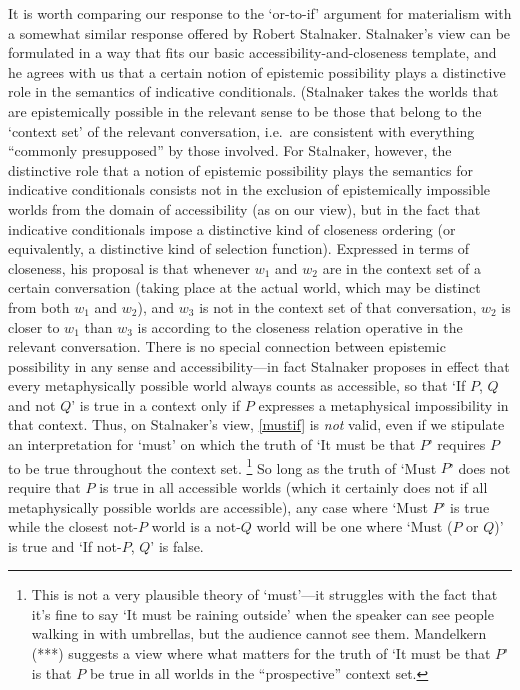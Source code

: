 \documentclass[If.tex]{subfiles}
\begin{document}
It is worth comparing our response to the ‘or-to-if’ argument for materialism with a somewhat similar response offered by Robert Stalnaker.  Stalnaker's view can be formulated in a way that fits our basic accessibility-and-closeness template, and he agrees with us that a certain notion of epistemic possibility plays a distinctive role in the semantics of indicative conditionals.  (Stalnaker takes the worlds that are epistemically possible in the relevant sense to be those that belong to the ‘context set’ of the relevant conversation, i.e.\ are consistent with everything “commonly presupposed” by those involved.  For Stalnaker, however, the distinctive role that a notion of epistemic possibility plays the semantics for indicative conditionals consists not in the exclusion of epistemically impossible worlds from the domain of accessibility (as on our view), but in the fact that indicative conditionals impose a distinctive kind of closeness ordering (or equivalently, a distinctive kind of selection function).   Expressed in terms of closeness, his proposal is that whenever $w_1$ and $w_2$ are in the context set of a certain conversation (taking place at the actual world, which may be distinct from both $w_1$ and $w_2$), and $w_3$ is not in the context set of that conversation, $w_2$ is closer to $w_1$ than $w_3$ is according to the closeness relation operative in the relevant conversation.  There is no special connection between epistemic possibility in any sense and accessibility---in fact Stalnaker proposes in effect that every metaphysically possible world always counts as accessible, so that ‘If $P$, $Q$ and not $Q$’ is true in a context only if $P$ expresses a metaphysical impossibility in that context.  Thus, on Stalnaker's view, \ref{mustif} is \emph{not} valid, even if we stipulate an interpretation for ‘must’ on which the truth of ‘It must be that $P$’ requires $P$ to be true throughout the context set.%
\footnote{This is not a very plausible theory of ‘must’---it struggles with the fact that it's fine to say ‘It must be raining outside’ when the speaker can see people walking in with umbrellas, but the audience cannot see them.  Mandelkern (***) suggests a view where what matters for the truth of ‘It must be that $P$’ is that $P$ be true in all worlds in the “prospective” context set.}  
So long as the truth of ‘Must $P$’ does not require that $P$ is true in all accessible worlds (which it certainly does not if all metaphysically possible worlds are accessible), any case where ‘Must $P$’ is true while the closest not-$P$ world is a not-$Q$ world will be one where ‘Must ($P$ or $Q$)’ is true and ‘If not-$P$, $Q$’ is false.
\end{document}
